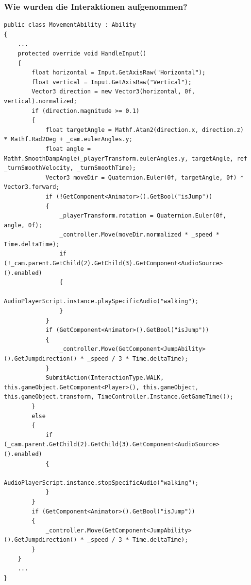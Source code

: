 \subsubsection{Wie wurden die Interaktionen aufgenommen?}\label{sec:good_05}

\begin{lstlisting}[caption={Aufnahme von Bewegungen}, label={sec:movementAbility_old}]
public class MovementAbility : Ability
{
    ...
    protected override void HandleInput()
    {
        float horizontal = Input.GetAxisRaw("Horizontal");
        float vertical = Input.GetAxisRaw("Vertical");
        Vector3 direction = new Vector3(horizontal, 0f, vertical).normalized;
        if (direction.magnitude >= 0.1)
        {
            float targetAngle = Mathf.Atan2(direction.x, direction.z) * Mathf.Rad2Deg + _cam.eulerAngles.y;
            float angle = Mathf.SmoothDampAngle(_playerTransform.eulerAngles.y, targetAngle, ref _turnSmoothVelocity, _turnSmoothTime);
            Vector3 moveDir = Quaternion.Euler(0f, targetAngle, 0f) * Vector3.forward;
            if (!GetComponent<Animator>().GetBool("isJump"))
            {
                _playerTransform.rotation = Quaternion.Euler(0f, angle, 0f);
                _controller.Move(moveDir.normalized * _speed * Time.deltaTime);
                if (!_cam.parent.GetChild(2).GetChild(3).GetComponent<AudioSource>().enabled)
                {
                    AudioPlayerScript.instance.playSpecificAudio("walking");
                }
            }
            if (GetComponent<Animator>().GetBool("isJump"))
            {
                _controller.Move(GetComponent<JumpAbility>().GetJumpdirection() * _speed / 3 * Time.deltaTime);
            }
            SubmitAction(InteractionType.WALK, this.gameObject.GetComponent<Player>(), this.gameObject, this.gameObject.transform, TimeController.Instance.GetGameTime());
        }
        else
        {
            if (_cam.parent.GetChild(2).GetChild(3).GetComponent<AudioSource>().enabled)
            {
                AudioPlayerScript.instance.stopSpecificAudio("walking");
            }
        }
        if (GetComponent<Animator>().GetBool("isJump"))
        {
            _controller.Move(GetComponent<JumpAbility>().GetJumpdirection() * _speed / 3 * Time.deltaTime);
        }
    }
    ...
}
\end{lstlisting}

